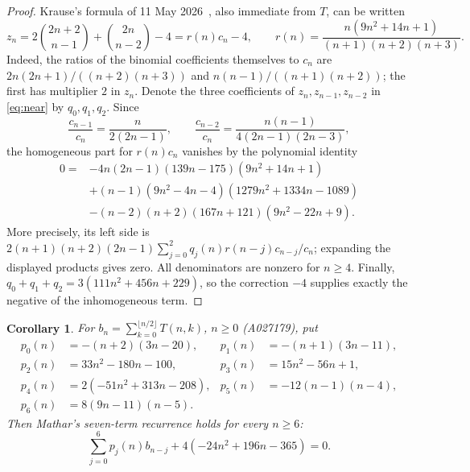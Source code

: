 \documentclass[11pt]{article}
\newtheorem{corollary}[theorem]{Corollary}
\newcommand{\bin}[2]{\binom{#1}{#2}}
\begin{document}
\begin{proof}
Krause's formula of 11 May 2026~\cite{A027174}, also immediate from $T$,
can be written
\[
z_n=2\bin{2n+2}{n-1}+\bin{2n}{n-2}-4=r(n)c_n-4,
\qquad r(n)=\frac{n(9n^2+14n+1)}{(n+1)(n+2)(n+3)}.
\]
Indeed, the ratios of the binomial coefficients themselves to $c_n$ are
$2n(2n+1)/((n+2)(n+3))$ and $n(n-1)/((n+1)(n+2))$;
the first has multiplier $2$ in $z_n$.
Denote the three coefficients of $z_n,z_{n-1},z_{n-2}$ in
\eqref{eq:near} by $q_0,q_1,q_2$. Since
\[
\frac{c_{n-1}}{c_n}=\frac{n}{2(2n-1)},\qquad
\frac{c_{n-2}}{c_n}=\frac{n(n-1)}{4(2n-1)(2n-3)},
\]
the homogeneous part for $r(n)c_n$ vanishes by the polynomial identity
\begin{equation}\label{eq:nearcert}
\begin{aligned}
0={}&-4n(2n-1)(139n-175)(9n^2+14n+1)\\
 &+(n-1)(9n^2-4n-4)(1279n^2+1334n-1089)\\
 &-(n-2)(n+2)(167n+121)(9n^2-22n+9).
\end{aligned}
\end{equation}
More precisely, its left side is
$2(n+1)(n+2)(2n-1)\sum_{j=0}^2q_j(n)r(n-j)c_{n-j}/c_n$;
expanding the displayed products gives zero. All denominators are nonzero
for $n\geq4$. Finally,
$q_0+q_1+q_2=3(111n^2+456n+229)$, so the correction $-4$ supplies
exactly the negative of the inhomogeneous term.
\end{proof}

\begin{corollary}\label{cor:half}
For $b_n=\sum_{k=0}^{\lfloor n/2\rfloor}T(n,k)$, $n\geq0$ (A027179),
put
\begin{align*}
p_0(n)&=-(n+2)(3n-20),&p_1(n)&=-(n+1)(3n-11),\\
p_2(n)&=33n^2-180n-100,&p_3(n)&=15n^2-56n+1,\\
p_4(n)&=2(-51n^2+313n-208),&p_5(n)&=-12(n-1)(n-4),\\
p_6(n)&=8(9n-11)(n-5).
\end{align*}
Then Mathar's seven-term recurrence holds for every $n\geq6$:
\begin{equation}\label{eq:half}
\sum_{j=0}^6p_j(n)b_{n-j}+4(-24n^2+196n-365)=0.
\end{equation}
\end{corollary}
\end{document}
